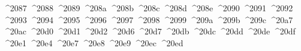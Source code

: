 {  ^^^^2087%
  ^^^^2088%
  ^^^^2089%
  ^^^^208a%
  ^^^^208b%
  ^^^^208c%
  ^^^^208d%
  ^^^^208e%
  ^^^^2090%
  ^^^^2091%
  ^^^^2092%
  ^^^^2093%
  ^^^^2094%
  ^^^^2095%
  ^^^^2096%
  ^^^^2097%
  ^^^^2098%
  ^^^^2099%
  ^^^^209a%
  ^^^^209b%
  ^^^^209c%
  ^^^^20a7%
  ^^^^20ac%
  ^^^^20d0%
  ^^^^20d1%
  ^^^^20d2%
  ^^^^20d6%
  ^^^^20d7%
  ^^^^20db%
  ^^^^20dc%
  ^^^^20dd%
  ^^^^20de%
  ^^^^20df%
  ^^^^20e1%
  ^^^^20e4%
  ^^^^20e7%
  ^^^^20e8%
  ^^^^20e9%
  ^^^^20ec%
  ^^^^20ed%
}
